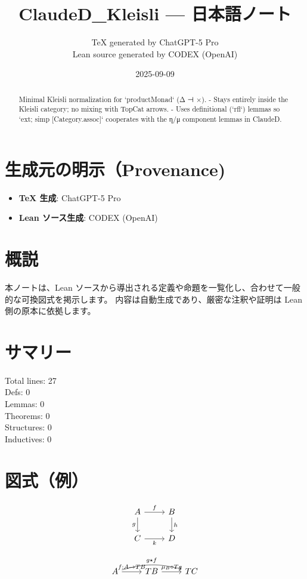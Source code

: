 \documentclass[12pt]{article}
\title{ClaudeD\_Kleisli — 日本語ノート}
\author{TeX generated by ChatGPT-5 Pro\\Lean source generated by CODEX (OpenAI)}
\date{2025-09-09}
\theoremstyle{definition}
\begin{document}
\maketitle

\begin{abstract}
Minimal Kleisli normalization for `productMonad` (Δ ⊣ ×).
  - Stays entirely inside the Kleisli category; no mixing with TopCat arrows.
  - Uses definitional (`rfl`) lemmas so `ext; simp [Category.assoc]` cooperates
    with the η/μ component lemmas in ClaudeD.
\end{abstract}

\section*{生成元の明示（Provenance)}
\begin{itemize}
  \item \textbf{TeX 生成}: ChatGPT-5 Pro
  \item \textbf{Lean ソース生成}: CODEX (OpenAI)
\end{itemize}

\section*{概説}
本ノートは、Lean ソースから導出される定義や命題を一覧化し、合わせて一般的な可換図式を掲示します。
内容は自動生成であり、厳密な注釈や証明は Lean 側の原本に依拠します。

\section*{サマリー}
Total lines: 27\\
Defs: 0\\
Lemmas: 0\\
Theorems: 0\\
Structures: 0\\
Inductives: 0

\section*{図式（例）}

\[
\begin{tikzcd}
A \arrow[r, "f"] \arrow[d, "g"'] & B \arrow[d, "h"] \\
C \arrow[r, "k"'] & D
\end{tikzcd}
\]



\[
\begin{tikzcd}
A \arrow[r, "f: A \to TB"] \arrow[rr, bend left=15, "{g \star f}"] & TB \arrow[r, "{\mu_B \circ T g}"] & TC
\end{tikzcd}
\]
\end{document}
